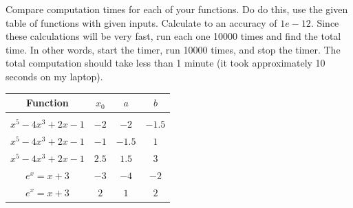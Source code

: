 \documentclass[11pt,letterpaper]{article}
\begin{document}
\begin{problem}
 Compare computation times for each of your functions. Do do this, use the given table of functions
with given inputs. Calculate to an accuracy of $1e-12$. Since these calculations will be very fast,
run each one 10000 times and find the total time. In other words, start the timer, run 10000 times,
and stop the timer. The total computation should take less than 1 minute (it took approximately 
10 seconds on my laptop).

\begin{table}[!ht]
\centering
 \begin{tabular}{cccc}
 Function & $x_0$ & $a$ & $b$ \\ \hline
 &  & &  \\[-2ex]
$x^5-4x^3+2x-1$ & $-2$ & $-2$ & $-1.5$ \\
$x^5-4x^3+2x-1$ & $-1$ & $-1.5$ & $1$ \\
$x^5-4x^3+2x-1$ & $2.5$ & $1.5$ & $3$ \\
$e^x=x+3$ & $-3$ & $-4$ & $-2$ \\
$e^x=x+3$ & $2$ & $1$ & $2$ \\
 \end{tabular}
\end{table}
\end{problem}
\end{document}
